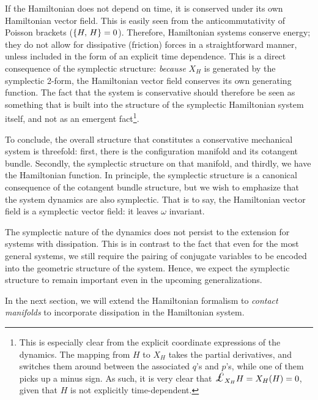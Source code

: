 If the Hamiltonian does not depend on time, it is conserved under its own Hamiltonian vector field. This is easily seen from the anticommutativity of Poisson brackets (\(\qty{H,\,H} = 0\)). Therefore, Hamiltonian systems conserve energy; they do not allow for dissipative (friction) forces in a straightforward manner, unless included in the form of an explicit time dependence. This is a direct consequence of the symplectic structure: \emph{because} \(X_H\) is generated by the symplectic 2-form, the Hamiltonian vector field conserves its own generating function. The fact that the system is conservative should therefore be seen as something that is built into the structure of the symplectic Hamiltonian system itself, and not as an emergent fact\footnote{This is especially clear from the explicit coordinate expressions of the dynamics. The mapping from \(H\) to \(X_H\) takes the partial derivatives, and switches them around between the associated \(q\)'s and \(p\)'s, while one of them picks up a minus sign. As such, it is very clear that \(\lied{X_H}{H} = X_H(H) = 0\), given that \(H\) is not explicitly time-dependent.}.

To conclude, the overall structure that constitutes a conservative mechanical system is threefold: first, there is the configuration manifold and its cotangent bundle. Secondly, the symplectic structure on that manifold, and thirdly, we have the Hamiltonian function. In principle, the symplectic structure is a canonical consequence of the cotangent bundle structure, but we wish to emphasize that the system dynamics are also symplectic. That is to say, the Hamiltonian vector field is a symplectic vector field: it leaves \(\omega\) invariant. 

The symplectic nature of the dynamics does not persist to the extension for systems with dissipation. This is in contrast to the fact that even for the most general systems, we still require the pairing of conjugate variables to be encoded into the geometric structure of the system. Hence, we expect the symplectic structure to remain important even in the upcoming generalizations.

In the next section, we will extend the Hamiltonian formalism to \emph{contact manifolds} to incorporate dissipation in the Hamiltonian system.
